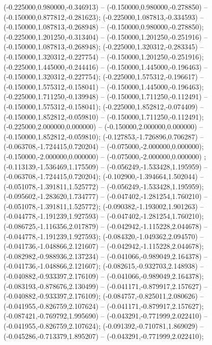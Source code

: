  (-0.225000,0.980000,-0.346913) -- (-0.150000,0.980000,-0.278850) -- (-0.150000,0.877812,-0.281623);
 (-0.225000,1.087813,-0.334593) -- (-0.150000,1.087813,-0.268948) -- (-0.150000,0.980000,-0.278850);
 (-0.225000,1.201250,-0.313404) -- (-0.150000,1.201250,-0.251916) -- (-0.150000,1.087813,-0.268948);
 (-0.225000,1.320312,-0.283345) -- (-0.150000,1.320312,-0.227754) -- (-0.150000,1.201250,-0.251916);
 (-0.225000,1.445000,-0.244416) -- (-0.150000,1.445000,-0.196463) -- (-0.150000,1.320312,-0.227754);
 (-0.225000,1.575312,-0.196617) -- (-0.150000,1.575312,-0.158041) -- (-0.150000,1.445000,-0.196463);
 (-0.225000,1.711250,-0.139948) -- (-0.150000,1.711250,-0.112491) -- (-0.150000,1.575312,-0.158041);
 (-0.225000,1.852812,-0.074409) -- (-0.150000,1.852812,-0.059810) -- (-0.150000,1.711250,-0.112491);
 (-0.225000,2.000000,0.000000) -- (-0.150000,2.000000,0.000000) -- (-0.150000,1.852812,-0.059810);
 (-0.127853,-1.726896,0.706287) -- (-0.063708,-1.724415,0.720204) -- (-0.075000,-2.000000,0.000000);
 (-0.150000,-2.000000,0.000000) -- (-0.075000,-2.000000,0.000000) ;
 (-0.113139,-1.536469,1.175509) -- (-0.056249,-1.533428,1.195959) -- (-0.063708,-1.724415,0.720204);
 (-0.102900,-1.394664,1.502044) -- (-0.051078,-1.391811,1.525772) -- (-0.056249,-1.533428,1.195959);
 (-0.095602,-1.283620,1.734777) -- (-0.047402,-1.281254,1.760210) -- (-0.051078,-1.391811,1.525772);
 (-0.090382,-1.193002,1.901263) -- (-0.044778,-1.191239,1.927593) -- (-0.047402,-1.281254,1.760210);
 (-0.086725,-1.116356,2.017879) -- (-0.042942,-1.115228,2.044678) -- (-0.044778,-1.191239,1.927593);
 (-0.084320,-1.049362,2.094570) -- (-0.041736,-1.048866,2.121607) -- (-0.042942,-1.115228,2.044678);
 (-0.082982,-0.988936,2.137234) -- (-0.041066,-0.989049,2.164378) -- (-0.041736,-1.048866,2.121607);
 (-0.082615,-0.932703,2.148938) -- (-0.040882,-0.933397,2.176109) -- (-0.041066,-0.989049,2.164378);
 (-0.083193,-0.878676,2.130499) -- (-0.041171,-0.879917,2.157627) -- (-0.040882,-0.933397,2.176109);
 (-0.084757,-0.825011,2.080626) -- (-0.041955,-0.826759,2.107624) -- (-0.041171,-0.879917,2.157627);
 (-0.087421,-0.769792,1.995690) -- (-0.043291,-0.771999,2.022410) -- (-0.041955,-0.826759,2.107624);
 (-0.091392,-0.710781,1.869029) -- (-0.045286,-0.713379,1.895207) -- (-0.043291,-0.771999,2.022410);
